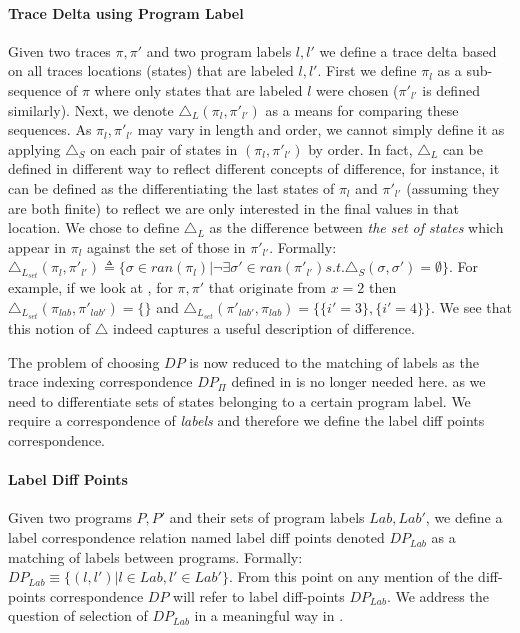 \paragraph{Trace Delta using Program Label} 
Given two traces $\pi,\pi'$ and two program labels $l,l'$ we define a trace delta based on all traces locations (states) that are labeled $l,l'$. First we define $\pi_{l}$ as a sub-sequence of $\pi$ where only states that are labeled $l$ were chosen ($\pi'_{l'}$ is defined similarly). Next, we denote $\triangle_L(\pi_{l},\pi'_{l'})$ as a means for comparing these sequences. As $\pi_{l},\pi'_{l'}$ may vary in length and order, we cannot simply define it as applying $\triangle_{S}$ on each pair of states in $(\pi_{l},\pi'_{l'})$ by order. In fact, $\triangle_{L}$ can be defined in different way to reflect different concepts of difference, for instance, it can be defined as the differentiating the last states of $\pi_{l}$ and $\pi'_{l'}$ (assuming they are both finite) to reflect we are only interested in the final values in that location. We chose to define $\triangle_{L}$ as the difference between \emph{the set of states} which appear in $\pi_{l}$ against the set of those in $\pi'_{l'}$. Formally: $\triangle_{L_{set}}(\pi_{l},\pi'_{l'}) \triangleq \{ \sigma \in ran(\pi_{l}) | \neg \exists \sigma' \in ran(\pi'_{l'}) s.t. \triangle_{S}(\sigma,\sigma') = \emptyset \}$. For example, if we look at , for $\pi, \pi'$ that originate from $x=2$  then $\triangle_{L_{set}}(\pi_{lab},\pi'_{lab'}) = \{\}$ and $\triangle_{L_{set}}(\pi'_{lab'},\pi_{lab}) = \{\{ i'=3 \},\{i'=4\}\}$. We see that this notion of $\triangle$ indeed captures a useful description of difference.

The problem of choosing $DP$ is now reduced to the matching of labels as the trace indexing correspondence $DP_{\Pi}$ defined in  is no longer needed here. as we need to differentiate sets of states belonging to a certain program label. We require a correspondence of \emph{labels} and therefore we define the label diff points correspondence.

\paragraph{Label Diff Points} 
Given two programs $P,P'$ and their sets of program labels $Lab,Lab'$, we define a label correspondence relation named label diff points denoted $DP_{Lab}$ as a matching of labels between programs. Formally: $DP_{Lab} \equiv \{(l,l')|l \in Lab, l' \in Lab'\}$. From this point on any mention of the diff-points correspondence $DP$ will refer to label diff-points $DP_{Lab}$. We address the question of selection of $DP_{Lab}$ in a meaningful way in . %

